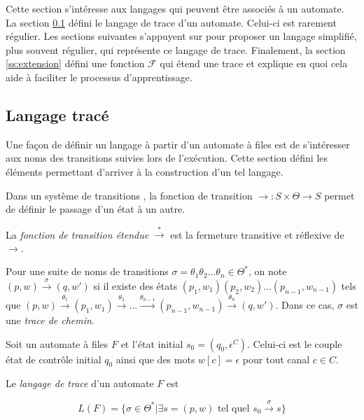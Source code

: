 Cette section s'intéresse aux langages qui peuvent être associés à un automate. La section \ref{ss:trace} défini le langage de trace d'un automate. Celui-ci est rarement régulier. Les sections suivantes s'appuyent sur \cite{Vardhan04} pour proposer un langage simplifié, plus souvent régulier, qui représente ce langage de trace. Finalement, la section \ref{ss:extension} défini une fonction $\mathcal{F}$ qui étend une trace et explique en quoi cela aide à faciliter le processus d'apprentissage.



\subsection{Langage tracé}\label{ss:trace}

Une façon de définir un langage à partir d'un automate à files est de s'intéresser aux noms des transitions suivies lors de l'exécution. Cette section défini les éléments permettant d'arriver à la construction d'un tel langage.

Dans un système de transitions \tsys, la fonction de transition $\rightarrow:S\times\Theta\rightarrow S$ permet de définir le passage d'un état à un autre.

La \emph{fonction de transition étendue} $\xrightarrow{*}$ est la fermeture transitive et réflexive de $\rightarrow$.

Pour une suite de noms de transitions $\sigma=\theta_1\theta_2 ...\theta_n\in\Theta^*$, on note $(p,w)\xrightarrow{\sigma}(q,w')$ si il existe des états $(p_1,w_1)(p_2,w_2)...(p_{n-1},w_{n-1})$ tels que $(p,w)\xrightarrow{\theta_1}(p_1,w_1)\xrightarrow{\theta_2}...\xrightarrow{\theta_{n-1}}(p_{n-1},w_{n-1})\xrightarrow{\theta_n}(q,w')$. Dans ce cas, $\sigma$ est une \emph{trace de chemin}.

\begin{definition} Soit un automate à files $F$ et l'état initial $s_0=(q_0, \epsilon^C)$. Celui-ci est le couple état de contrôle initial $q_0$ ainsi que des mots $w[c]=\epsilon$ pour tout canal $c\in C$.

  Le \emph{langage de trace} d'un automate $F$ est

  $$
  L(F)=\{\sigma\in\Theta^*|\exists s=(p,w) \text{ tel quel } s_0\xrightarrow{\sigma}s\}
  $$
\end{definition}

